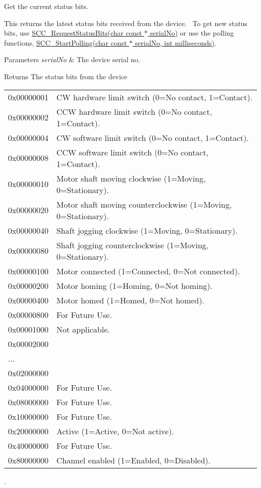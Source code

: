 Get the current status bits. 

This returns the latest status bits received from the device.~\newline
 To get new status bits, use \hyperlink{group___t_cube_stepper_ga16b8fd5532b13c5c8d30a69890bbc081}{S\+C\+C\+\_\+\+Request\+Status\+Bits(char const $\ast$ serial\+No)} or use the polling functions, \hyperlink{group___t_cube_stepper_gaedb186035185cfc75f328231770c83e2}{S\+C\+C\+\_\+\+Start\+Polling(char const $\ast$ serial\+No, int milliseconds)}. 


\begin{DoxyParams}{Parameters}
{\em serial\+No} & The device serial no. \\
\hline
\end{DoxyParams}
\begin{DoxyReturn}{Returns}
The status bits from the device \tabulinesep=1mm
\begin{longtabu} spread 0pt [c]{*2{|X[-1]}|}
\hline
0x00000001&CW hardware limit switch (0=No contact, 1=Contact). \\
0x00000002&C\+CW hardware limit switch (0=No contact, 1=Contact). \\
0x00000004&CW software limit switch (0=No contact, 1=Contact). \\
0x00000008&C\+CW software limit switch (0=No contact, 1=Contact). \\
0x00000010&Motor shaft moving clockwise (1=Moving, 0=Stationary). \\
0x00000020&Motor shaft moving counterclockwise (1=Moving, 0=Stationary). \\
0x00000040&Shaft jogging clockwise (1=Moving, 0=Stationary). \\
0x00000080&Shaft jogging counterclockwise (1=Moving, 0=Stationary). \\
0x00000100&Motor connected (1=Connected, 0=Not connected). \\
0x00000200&Motor homing (1=Homing, 0=Not homing). \\
0x00000400&Motor homed (1=Homed, 0=Not homed). \\
0x00000800&For Future Use. \\
0x00001000&Not applicable. \\
0x00002000&\\
...&\\
0x02000000&\\
0x04000000&For Future Use. \\
0x08000000&For Future Use. \\
0x10000000&For Future Use. \\
0x20000000&Active (1=Active, 0=Not active). \\
0x40000000&For Future Use. \\
0x80000000&Channel enabled (1=Enabled, 0=Disabled). \\
\end{longtabu}
. 
\end{DoxyReturn}
